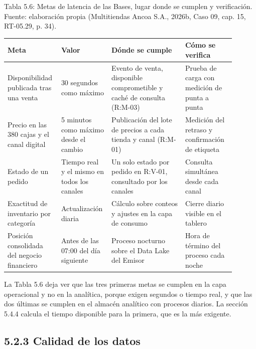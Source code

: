 \documentclass[11pt]{article}
\begin{document}
\par\vspace{0.6\baselineskip}\noindent\begin{minipage}{\linewidth}
Tabla 5.6: Metas de latencia de las Bases, lugar donde se cumplen y verificación. Fuente: elaboración propia (Multitiendas Ancoa S.A., 2026b, Caso 09, cap. 15, RT-05.29, p. 34).\label{tab:t11}\par\vspace{0.3\baselineskip}
\begin{tabular}{@{}p{0.191\linewidth}p{0.181\linewidth}p{0.313\linewidth}p{0.217\linewidth}@{}}
\toprule Meta & Valor & Dónde se cumple & Cómo se verifica \\
\midrule
Disponibilidad publicada tras una venta & 30 segundos como máximo & Evento de venta, disponible comprometible y caché de consulta (R:M-03) & Prueba de carga con medición de punta a punta \\
Precio en las 380 cajas y el canal digital & 5 minutos como máximo desde el cambio & Publicación del lote de precios a cada tienda y canal (R:M-01) & Medición del retraso y confirmación de etiqueta \\
Estado de un pedido & Tiempo real y el mismo en todos los canales & Un solo estado por pedido en R:V-01, consultado por los canales & Consulta simultánea desde cada canal \\
Exactitud de inventario por categoría & Actualización diaria & Cálculo sobre conteos y ajustes en la capa de consumo & Cierre diario visible en el tablero \\
Posición consolidada del negocio financiero & Antes de las 07:00 del día siguiente & Proceso nocturno sobre el Data Lake del Emisor & Hora de término del proceso cada noche \\
\bottomrule
\end{tabular}
\end{minipage}
\par


La Tabla 5.6 deja ver que las tres primeras metas se cumplen en la capa operacional y no en la analítica, porque exigen segundos o tiempo real, y que las dos últimas se cumplen en el almacén analítico con procesos diarios. La sección 5.4.4 calcula el tiempo disponible para la primera, que es la más exigente.

\subsection{5.2.3 Calidad de los datos}
\end{document}
